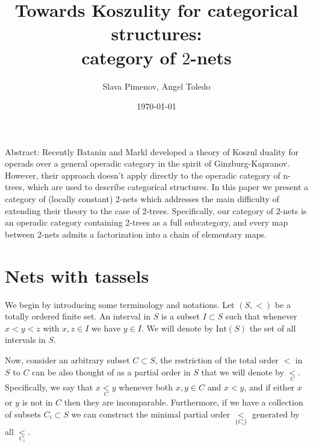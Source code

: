 \documentclass[letterpaper,12pt,leqno]{article}
\numberwithin{equation}{theorem}
\def\Int{\mathrm{Int}}
\def\lesub{\mathop{<}\limits}
\begin{document}
\title{Towards Koszulity for categorical structures:\\ category of $2$-nets}
\author{Slava Pimenov, Angel Toledo\def\thefootnote{\arabic{footnote}}\footnotemark[1]}
\date{\today}
\titlepage
\maketitle

\tableofcontents
{}
\vfill\eject

\ifx

Abstract:
Recently Batanin and Markl developed a theory of Koszul duality for operads over a general operadic category in the spirit of Ginzburg-Kapranov. However, their approach doesn't
apply directly to the operadic category of n-trees, which are used to describe categorical structures. In this paper we present a category of (locally constant) 2-nets which addresses
the main difficulty of extending their theory to the case of 2-trees. Specifically, our category of 2-nets is an operadic category containing 2-trees
as a full subcategory, and every map between 2-nets admits a factorization into a chain of elementary maps.

\section{Nets with tassels}
We begin by introducing some terminology and notations.
Let $(S, <)$ be a totally ordered finite set. An interval in $S$ is a subset $I \subset S$ such that whenever $x < y < z$ with $x, z \in I$ we have $y \in I$.
We will denote by $\Int(S)$ the set of all intervals in $S$.

Now, consider an arbitrary subset $C \subset S$, the restriction of the total order $<$ in $S$ to $C$ can be also thought of as a partial order in $S$
that we will denote by $\lesub_C$. Specifically, we say that $x \lesub_C y$ whenever both $x, y \in C$ and $x < y$, and if either $x$ or $y$ is not in $C$
then they are incomparable. Furthermore, if we have a collection of subsets $C_i \subset S$ we can construct the minimal partial order $\lesub_{\{C_i\}}$ generated
by all $\lesub_{C_i}$.
\end{document}
